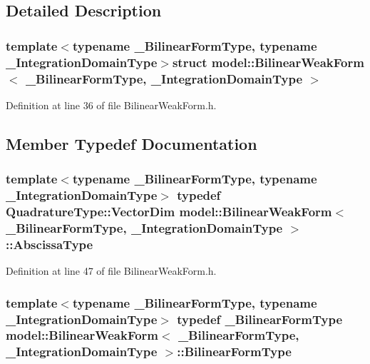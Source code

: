 \subsection{Detailed Description}
\subsubsection*{template$<$typename \+\_\+\+Bilinear\+Form\+Type, typename \+\_\+\+Integration\+Domain\+Type$>$struct model\+::\+Bilinear\+Weak\+Form$<$ \+\_\+\+Bilinear\+Form\+Type, \+\_\+\+Integration\+Domain\+Type $>$}



Definition at line 36 of file Bilinear\+Weak\+Form.\+h.



\subsection{Member Typedef Documentation}
\hypertarget{structmodel_1_1_bilinear_weak_form_ad1e097cb2bb06eaa186ff66db5e8932e}{}
\subsubsection[{Abscissa\+Type}]{\setlength{\rightskip}{0pt plus 5cm}template$<$typename \+\_\+\+Bilinear\+Form\+Type, typename \+\_\+\+Integration\+Domain\+Type$>$ typedef {\bf Quadrature\+Type\+::\+Vector\+Dim} {\bf model\+::\+Bilinear\+Weak\+Form}$<$ \+\_\+\+Bilinear\+Form\+Type, \+\_\+\+Integration\+Domain\+Type $>$\+::{\bf Abscissa\+Type}}\label{structmodel_1_1_bilinear_weak_form_ad1e097cb2bb06eaa186ff66db5e8932e}


Definition at line 47 of file Bilinear\+Weak\+Form.\+h.

\hypertarget{structmodel_1_1_bilinear_weak_form_a13052aab9ae19efbffa3d881ceb184f9}{}
\subsubsection[{Bilinear\+Form\+Type}]{\setlength{\rightskip}{0pt plus 5cm}template$<$typename \+\_\+\+Bilinear\+Form\+Type, typename \+\_\+\+Integration\+Domain\+Type$>$ typedef \+\_\+\+Bilinear\+Form\+Type {\bf model\+::\+Bilinear\+Weak\+Form}$<$ \+\_\+\+Bilinear\+Form\+Type, \+\_\+\+Integration\+Domain\+Type $>$\+::{\bf Bilinear\+Form\+Type}}\label{structmodel_1_1_bilinear_weak_form_a13052aab9ae19efbffa3d881ceb184f9}


